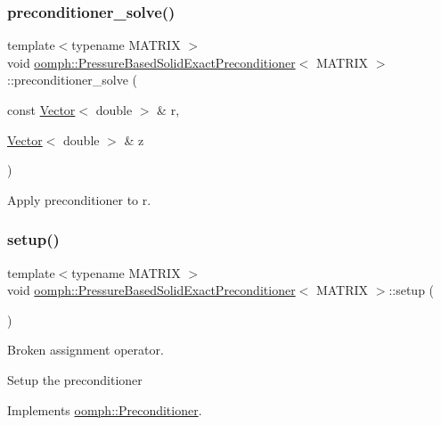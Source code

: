 \subsubsection{\texorpdfstring{preconditioner\+\_\+solve()}{preconditioner\_solve()}}
{\footnotesize\ttfamily template$<$typename M\+A\+T\+R\+IX $>$ \\
void \hyperlink{classoomph_1_1PressureBasedSolidExactPreconditioner}{oomph\+::\+Pressure\+Based\+Solid\+Exact\+Preconditioner}$<$ M\+A\+T\+R\+IX $>$\+::preconditioner\+\_\+solve (\begin{DoxyParamCaption}\item[{const \hyperlink{classoomph_1_1Vector}{Vector}$<$ double $>$ \&}]{r,  }\item[{\hyperlink{classoomph_1_1Vector}{Vector}$<$ double $>$ \&}]{z }\end{DoxyParamCaption})}



Apply preconditioner to r. 

\mbox{\label{classoomph_1_1PressureBasedSolidExactPreconditioner_ab9bdbcabd0ba8e9debfbec6679e66b08}} 
\subsubsection{\texorpdfstring{setup()}{setup()}}
{\footnotesize\ttfamily template$<$typename M\+A\+T\+R\+IX $>$ \\
void \hyperlink{classoomph_1_1PressureBasedSolidExactPreconditioner}{oomph\+::\+Pressure\+Based\+Solid\+Exact\+Preconditioner}$<$ M\+A\+T\+R\+IX $>$\+::setup (\begin{DoxyParamCaption}{ }\end{DoxyParamCaption})\hspace{0.3cm}{\ttfamily [virtual]}}



Broken assignment operator. 

Setup the preconditioner 

Implements \hyperlink{classoomph_1_1Preconditioner_af4886f4efe510e5c9b0eb19422943588}{oomph\+::\+Preconditioner}.



